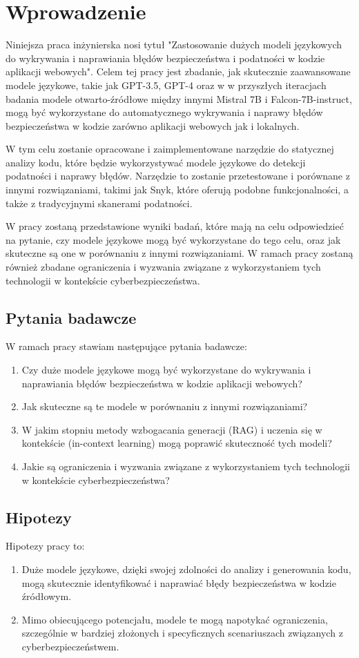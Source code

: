 
\chapter*{Wprowadzenie}

Niniejsza praca inżynierska nosi tytuł "Zastosowanie dużych modeli językowych do wykrywania i naprawiania błędów bezpieczeństwa i podatności w kodzie aplikacji webowych". Celem tej pracy jest zbadanie, jak skutecznie zaawansowane modele językowe, takie jak GPT-3.5, GPT-4 oraz w w przyszłych iteracjach badania modele otwarto-źródłowe między innymi Mistral 7B i Falcon-7B-instruct, mogą być wykorzystane do automatycznego wykrywania i naprawy błędów bezpieczeństwa w kodzie zarówno aplikacji webowych jak i lokalnych. 

W tym celu zostanie opracowane i zaimplementowane narzędzie do statycznej analizy kodu, które będzie wykorzystywać modele językowe do detekcji podatności i naprawy błędów.
Narzędzie to zostanie przetestowane i porównane z innymi rozwiązaniami, takimi jak Snyk, które oferują podobne funkcjonalności, a także z tradycyjnymi skanerami podatności.

W pracy zostaną przedstawione wyniki badań, które mają na celu odpowiedzieć na pytanie, czy modele językowe mogą być wykorzystane do tego celu, oraz jak skuteczne są one w porównaniu z innymi rozwiązaniami.
W ramach pracy zostaną również zbadane ograniczenia i wyzwania związane z wykorzystaniem tych technologii w kontekście cyberbezpieczeństwa.

\section*{Pytania badawcze}
W ramach pracy stawiam następujące pytania badawcze:
\begin{enumerate}
    \item Czy duże modele językowe mogą być wykorzystane do wykrywania i naprawiania błędów bezpieczeństwa w kodzie aplikacji webowych?
    \item Jak skuteczne są te modele w porównaniu z innymi rozwiązaniami?
    \item W jakim stopniu metody wzbogacania generacji (RAG) i uczenia się w kontekście (in-context learning) mogą poprawić skuteczność tych modeli?
    \item Jakie są ograniczenia i wyzwania związane z wykorzystaniem tych technologii w kontekście cyberbezpieczeństwa?
\end{enumerate}
\newpage
\section*{Hipotezy}
Hipotezy pracy to:
\begin{enumerate}
    \item Duże modele językowe, dzięki swojej zdolności do analizy i generowania kodu, mogą skutecznie identyfikować i naprawiać błędy bezpieczeństwa w kodzie źródłowym.
    \item Mimo obiecującego potencjału, modele te mogą napotykać ograniczenia, szczególnie w bardziej złożonych i specyficznych scenariuszach związanych z cyberbezpieczeństwem.
\end{enumerate}

